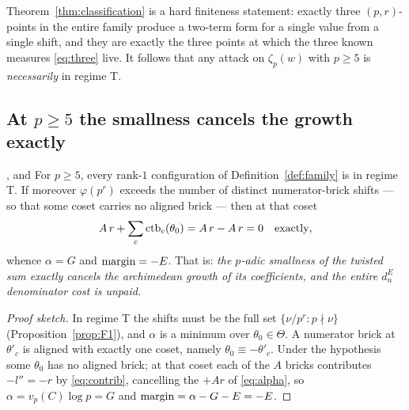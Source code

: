 Theorem~\ref{thm:classification} is a hard finiteness statement: exactly three
$(p,r)$-points in the entire family produce a two-term form for a single value from a single
shift, and they are exactly the three points at which the three known measures
\eqref{eq:three} live. It follows that any attack on $\zeta_p(w)$ with $p\ge5$ is
\emph{necessarily} in regime T.

\subsection{At \texorpdfstring{$p\ge5$}{p>=5} the smallness cancels the growth exactly}
\label{ss:pge5}

\begin{proposition}\label{prop:pge5}
\DERIVED{}, and  For $p\ge5$, every rank-$1$ configuration
of Definition~\ref{def:family} is in regime T. If moreover $\varphi(p^r)$ exceeds the number
of distinct numerator-brick shifts --- so that some coset carries no aligned brick --- then
at that coset
\[
 A\,r+\sum_c\operatorname{ctb}_c(\theta_0)=A\,r-A\,r=0\quad\text{exactly},
\]
whence $\alpha=G$ and $\operatorname{margin}=-E$. That is: \emph{the $p$-adic smallness of the twisted sum
exactly cancels the archimedean growth of its coefficients, and the entire $d_n^E$
denominator cost is unpaid.}
\end{proposition}

\begin{proof}[Proof sketch]
In regime T the shifts must be the full set $\{\nu/p^r:p\nmid\nu\}$
(Proposition~\ref{prop:F1}), and $\alpha$ is a minimum over $\theta_0\in\Theta$. A numerator
brick at $\theta'_c$ is aligned with exactly one coset, namely $\theta_0\equiv-\theta'_c$.
Under the hypothesis some $\theta_0$ has no aligned
brick; at that coset each of the $A$ bricks contributes $-l''=-r$ by \eqref{eq:contrib},
cancelling the $+Ar$ of \eqref{eq:alpha}, so $\alpha=v_p(C)\log p=G$ and
$\operatorname{margin}=\alpha-G-E=-E$.
\end{proof}

